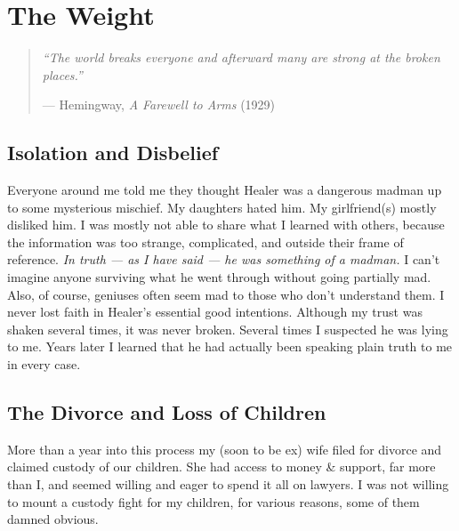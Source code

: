 
\chapter{The Weight}
\label{pos23:the-weight}

\begin{quote}\small\textit{%
``The world breaks everyone and afterward many are strong at the broken places.''%
}\par\raggedleft --- Hemingway, \textit{A Farewell to Arms} (1929)\end{quote}

\vspace{0.5cm}



\section*{Isolation and Disbelief}
\label{pos23:isolation-and-disbelief}

Everyone around me told me they thought Healer was a dangerous madman up to some mysterious mischief. My daughters hated him. My girlfriend(s) mostly disliked him. I was mostly not able to share what I learned with others, because the information was too strange, complicated, and outside their frame of reference. \textit{In truth --- as I have said --- he was something of a madman.} I can't imagine anyone surviving what he went through without going partially mad. Also, of course, geniuses often seem mad to those who don't understand them. I never lost faith in Healer's essential good intentions. Although my trust was shaken several times, it was never broken. Several times I suspected he was lying to me. Years later I learned that he had actually been speaking plain truth to me in every case.

\section*{The Divorce and Loss of Children}
\label{pos23:the-divorce-and-loss-of-children}

More than a year into this process my (soon to be ex) wife filed for divorce and claimed custody of our children. She had access to money \& support, far more than I, and seemed willing and eager to spend it all on lawyers. I was not willing to mount a custody fight for my children, for various reasons, some of them damned obvious.

